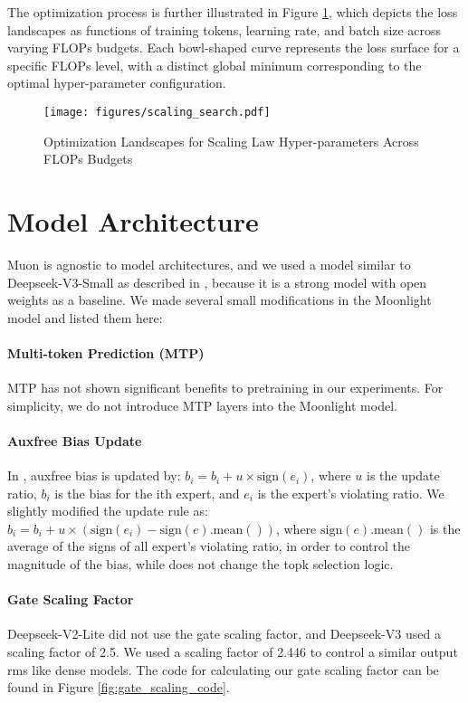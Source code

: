 The optimization process is further illustrated in Figure \ref{fig:scaling_search}, which depicts the loss landscapes as functions of training tokens, learning rate, and batch size across varying FLOPs budgets. Each bowl-shaped curve represents the loss surface for a specific FLOPs level, with a distinct global minimum corresponding to the optimal hyper-parameter configuration. 

\begin{figure}[t]
    \centering
    \texttt{[image: figures/scaling\_search.pdf]}
    \caption{Optimization Landscapes for Scaling Law Hyper-parameters Across FLOPs Budgets} 
    \label{fig:scaling_search} 
\end{figure}



\section{Model Architecture}
\label{sec:appendix:modelarch}

Muon is agnostic to model architectures, and we used a model similar to Deepseek-V3-Small as described in \cite{deepseekai2024deepseekv3technicalreport}, because it is a strong model with open weights as a baseline. We made several small modifications in the Moonlight model and listed them here:

\paragraph{Multi-token Prediction (MTP)} MTP has not shown significant benefits to pretraining in our experiments. For simplicity, we do not introduce MTP layers into the Moonlight model.

\paragraph{Auxfree Bias Update} In \cite{deepseekai2024deepseekv3technicalreport}, auxfree bias is updated by: $b_i = b_i + u \times  \text{sign}(e_i)$, where $u$ is the update ratio, $b_i$ is the bias for the ith expert, and $e_i$ is the expert's violating ratio. We slightly modified the update rule as: $b_i = b_i + u \times (\text{sign}(e_i) - \text{sign}(e).\text{mean}())$, where $\text{sign}(e).\text{mean}()$ is the average of the signs of all expert's violating ratio, in order to control the magnitude of the bias, while does not change the topk selection logic.

\paragraph{Gate Scaling Factor} Deepseek-V2-Lite did not use the gate scaling factor, and Deepseek-V3 used a scaling factor of 2.5. We used a scaling factor of 2.446 to control a similar output rms like dense models. The code for calculating our gate scaling factor can be found in Figure \ref{fig:gate_scaling_code}.



